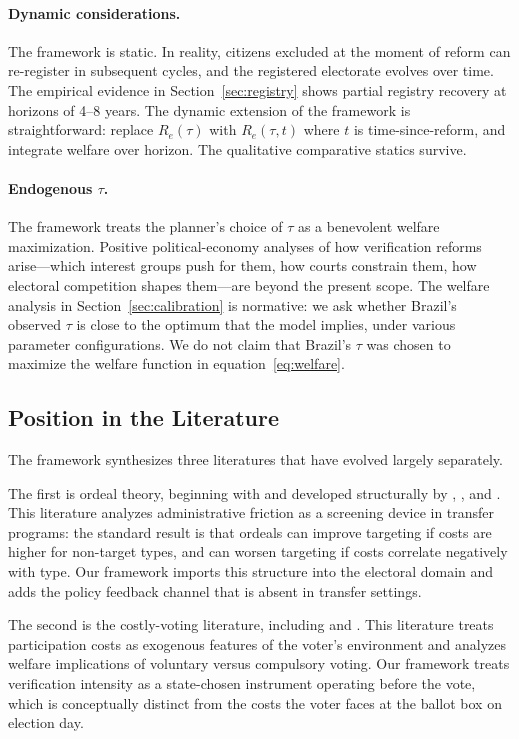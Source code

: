 \paragraph{Dynamic considerations.} The framework is static. In reality, citizens excluded at the moment of reform can re-register in subsequent cycles, and the registered electorate evolves over time. The empirical evidence in Section~\ref{sec:registry} shows partial registry recovery at horizons of 4--8 years. The dynamic extension of the framework is straightforward: replace $R_e(\tau)$ with $R_e(\tau, t)$ where $t$ is time-since-reform, and integrate welfare over horizon. The qualitative comparative statics survive.

\paragraph{Endogenous $\tau$.} The framework treats the planner's choice of $\tau$ as a benevolent welfare maximization. Positive political-economy analyses of how verification reforms arise---which interest groups push for them, how courts constrain them, how electoral competition shapes them---are beyond the present scope. The welfare analysis in Section~\ref{sec:calibration} is normative: we ask whether Brazil's observed $\tau$ is close to the optimum that the model implies, under various parameter configurations. We do not claim that Brazil's $\tau$ was chosen to maximize the welfare function in equation~\eqref{eq:welfare}.

\subsection{Position in the Literature}
\label{ssec:position}

The framework synthesizes three literatures that have evolved largely separately.

The first is ordeal theory, beginning with \citet{NicholsZeckhauser1982} and developed structurally by \citet{Alatas2016}, \citet{FinkelsteinNotowidigdoShepard2024}, and \citet{DeshpandeLi2019}. This literature analyzes administrative friction as a screening device in transfer programs: the standard result is that ordeals can improve targeting if costs are higher for non-target types, and can worsen targeting if costs correlate negatively with type. Our framework imports this structure into the electoral domain and adds the policy feedback channel that is absent in transfer settings.

The second is the costly-voting literature, including \citet{Borgers2004} and \citet{KrasaPolborn2009}. This literature treats participation costs as exogenous features of the voter's environment and analyzes welfare implications of voluntary versus compulsory voting. Our framework treats verification intensity as a state-chosen instrument operating before the vote, which is conceptually distinct from the costs the voter faces at the ballot box on election day.

